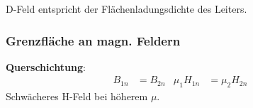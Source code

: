 D-Feld entspricht der Flächenladungsdichte des Leiters.\\


\subsubsection{Grenzfläche an magn. Feldern}
\textbf{Querschichtung}:
\begin{align*}
	B_{1n} &= B_{2n} & \mu_1 H_{1n}&=\mu_2 H_{2n}&
\end{align*}
Schwächeres H-Feld bei höherem $ \mu $.\\

